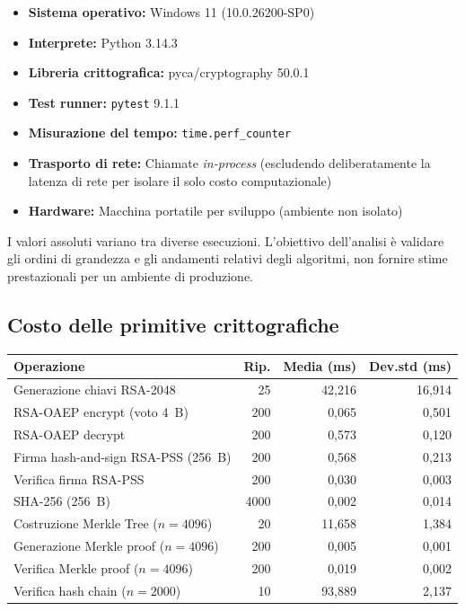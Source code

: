 \begin{itemize}
  \item \textbf{Sistema operativo:} Windows 11 (10.0.26200-SP0)
  \item \textbf{Interprete:} Python 3.14.3
  \item \textbf{Libreria crittografica:} pyca/cryptography 50.0.1
  \item \textbf{Test runner:} \texttt{pytest} 9.1.1
  \item \textbf{Misurazione del tempo:} \texttt{time.perf\_counter}
  \item \textbf{Trasporto di rete:} Chiamate \emph{in-process} (escludendo deliberatamente la latenza di rete per isolare il solo costo computazionale)
  \item \textbf{Hardware:} Macchina portatile per sviluppo (ambiente non isolato)
\end{itemize}

I valori assoluti variano tra diverse esecuzioni. L'obiettivo dell'analisi è validare gli ordini di grandezza e gli andamenti relativi degli algoritmi, non fornire stime prestazionali per un ambiente di produzione.

\subsection{Costo delle primitive crittografiche}
\label{subsec:wp4_primitive_tempi}

\begin{center}
\small
\begin{tabular}{|l|r|r|r|}
\hline
\textbf{Operazione} & \textbf{Rip.} & \textbf{Media (ms)} & \textbf{Dev.std (ms)} \\
\hline
Generazione chiavi RSA-2048      & 25   & 42,216  & 16,914 \\
RSA-OAEP encrypt (voto 4~B)      & 200  & 0,065   & 0,501  \\
RSA-OAEP decrypt                 & 200  & 0,573   & 0,120  \\
Firma hash-and-sign RSA-PSS (256~B) & 200 & 0,568  & 0,213  \\
Verifica firma RSA-PSS           & 200  & 0,030   & 0,003  \\
SHA-256 (256~B)                  & 4000 & 0,002   & 0,014  \\
Costruzione Merkle Tree ($n=4096$) & 20  & 11,658  & 1,384  \\
Generazione Merkle proof ($n=4096$) & 200 & 0,005  & 0,001  \\
Verifica Merkle proof ($n=4096$) & 200  & 0,019   & 0,002  \\
Verifica hash chain ($n=2000$)   & 10   & 93,889  & 2,137  \\
\hline
\end{tabular}
\end{center}

